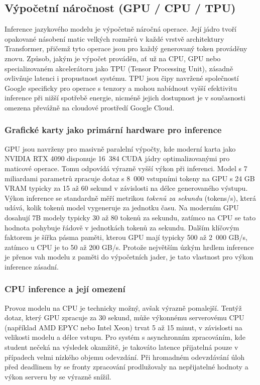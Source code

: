 \subsection{Výpočetní náročnost (GPU / CPU / TPU)}
\label{subsec:llm-computational-cost}

Inference jazykového modelu je výpočetně náročná operace.
Její jádro tvoří opakované násobení matic velkých rozměrů v každé vrstvě architektury Transformer, přičemž tyto operace jsou pro každý generovaný token prováděny znovu.
Způsob, jakým je výpočet prováděn, ať už na CPU, GPU nebo specializovaném akcelerátoru jako TPU (Tensor Processing Unit), zásadně ovlivňuje latenci i propustnost systému.
TPU jsou čipy navržené společností Google specificky pro operace s tenzory a mohou nabídnout vyšší efektivitu inference při nižší spotřebě energie, nicméně jejich dostupnost je v současnosti omezena převážně na cloudové prostředí Google Cloud.

\subsubsection*{Grafické karty jako primární hardware pro inference}
\label{subsubsec:llm-computational-cost-gpu}

GPU jsou navrženy pro masivně paralelní výpočty, kde moderní karta jako NVIDIA RTX 4090 disponuje 16~384 CUDA jádry optimalizovanými pro maticové operace.
Tomu odpovídá výrazně vyšší výkon při inferenci.
Model s 7 miliardami parametrů zpracuje dotaz s 8~000 vstupními tokeny na GPU s 24 GB VRAM typicky za 15 až 60 sekund v závislosti na délce generovaného výstupu.
Výkon inference se standardně měří metrikou \textit{tokenů za sekundu} (tokens/s), která udává, kolik tokenů model vygeneruje za jednotku času.
Na moderním GPU dosahují 7B modely typicky 30 až 80 tokenů za sekundu, zatímco na CPU se tato hodnota pohybuje řádově v jednotkách tokenů za sekundu.
Dalším klíčovým faktorem je šířka pásma paměti, kterou GPU mají typicky 500 až 2~000 GB/s, zatímco u CPU je to 50 až 200 GB/s.
Protože největším úzkým hrdlem inference je přenos vah modelu z paměti do výpočetních jader, je tato vlastnost pro výkon inference zásadní.

\subsubsection*{CPU inference a její omezení}
\label{subsubsec:llm-computational-cost-cpu}

Provoz modelu na CPU je technicky možný, avšak výrazně pomalejší.
Tentýž dotaz, který GPU zpracuje za 30 sekund, může výkonnému serverovému CPU (například AMD EPYC nebo Intel Xeon) trvat 5 až 15 minut, v závislosti na velikosti modelu a délce vstupu.
Pro systém s asynchronním zpracováním, kde student nečeká na výsledek okamžitě, je takováto latence přijatelná pouze v případech velmi nízkého objemu odevzdání.
Při hromadném odevzdávání úloh před deadlinem by se fronty zpracování prodlužovaly na nepřijatelné hodnoty a výkon serveru by se výrazně snížil.

